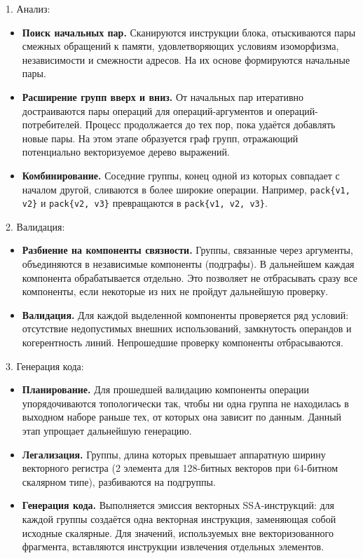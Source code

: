 1. Анализ:
\begin{itemize}
    \item \textbf{Поиск начальных пар.} Сканируются инструкции блока, отыскиваются пары смежных обращений к памяти, удовлетворяющих условиям изоморфизма, независимости и смежности адресов. 
    На их основе формируются начальные пары.
    
    \item \textbf{Расширение групп вверх и вниз.} От начальных пар итеративно достраиваются пары операций для операций-аргументов и операций-потребителей. 
    Процесс продолжается до тех пор, пока удаётся добавлять новые пары. На этом этапе образуется граф групп, отражающий потенциально векторизуемое дерево выражений.
    
    \item \textbf{Комбинирование.} Соседние группы, конец одной из которых совпадает с началом другой, сливаются в более широкие операции. 
    Например, \texttt{pack\{v1, v2\}} и \texttt{pack\{v2, v3\}} превращаются в \texttt{pack\{v1, v2, v3\}}. 
\end{itemize}

2. Валидация:
\begin{itemize}
    \item \textbf{Разбиение на компоненты связности.} Группы, связанные через аргументы, объединяются в независимые компоненты (подграфы). 
    В дальнейшем каждая компонента обрабатывается отдельно. 
    Это позволяет не отбрасывать сразу все компоненты, если некоторые из них не пройдут дальнейшую проверку.
    
    \item \textbf{Валидация.} Для каждой выделенной компоненты проверяется ряд условий: отсутствие недопустимых внешних использований, 
    замкнутость операндов и когерентность линий. 
    Непрошедшие проверку компоненты отбрасываются.
\end{itemize}

3. Генерация кода:
\begin{itemize}
    \item \textbf{Планирование.} Для прошедшей валидацию компоненты операции упорядочиваются топологически так, 
    чтобы ни одна группа не находилась в выходном наборе раньше тех, от которых она зависит по данным.
    Данный этап упрощает дальнейшую генерацию.
    
    \item \textbf{Легализация.} Группы, длина которых превышает аппаратную ширину векторного регистра 
    (2 элемента для 128-битных векторов при 64-битном скалярном типе), разбиваются на подгруппы.
    
    \item \textbf{Генерация кода.} Выполняется эмиссия векторных SSA-инструкций: для каждой группы создаётся одна векторная инструкция, заменяющая собой исходные скалярные. 
    Для значений, используемых вне векторизованного фрагмента, вставляются инструкции извлечения отдельных элементов.
\end{itemize}

